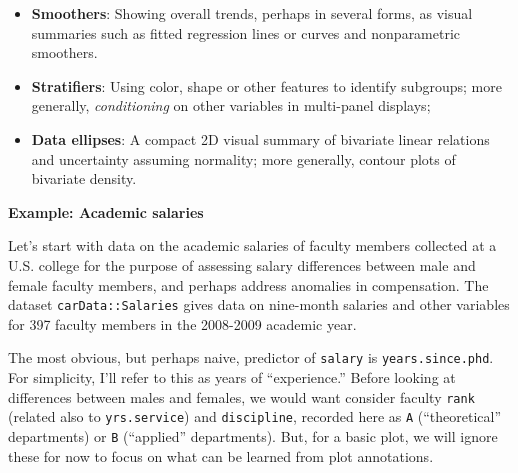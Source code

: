 \documentclass[
  letterpaper,
  10pt,
  krantz2]{krantz}
\makeatletter
\newenvironment{Shaded}{\begin{snugshade}}{\end{snugshade}}
\newcommand{\AttributeTok}[1]{\textcolor[rgb]{0.40,0.45,0.13}{#1}}
\newcommand{\CommentTok}[1]{\textcolor[rgb]{0.37,0.37,0.37}{#1}}
\newcommand{\FunctionTok}[1]{\textcolor[rgb]{0.28,0.35,0.67}{#1}}
\newcommand{\NormalTok}[1]{\textcolor[rgb]{0.00,0.23,0.31}{#1}}
\newcommand{\StringTok}[1]{\textcolor[rgb]{0.13,0.47,0.30}{#1}}
\providecommand{\tightlist}{%
  \setlength{\itemsep}{0pt}\setlength{\parskip}{0pt}}\usepackage{longtable,booktabs,array}
\newenvironment{kframe}{%
  \medskip{}
  \setlength{\fboxsep}{.8em}
  \def\at@end@of@kframe{}%
  \ifinner\ifhmode%
  \def\at@end@of@kframe{\end{minipage}}%
  \begin{minipage}{\columnwidth}%
  \fi\fi%
  \def\FrameCommand##1{\hskip\@totalleftmargin \hskip-\fboxsep
  \colorbox{shadecolor}{##1}\hskip-\fboxsep
      \hskip-\linewidth \hskip-\@totalleftmargin \hskip\columnwidth}%
  \MakeFramed {\advance\hsize-\width
    \@totalleftmargin\z@ \linewidth\hsize
    \@setminipage}}%
{\par\unskip\endMakeFramed%
  \at@end@of@kframe}
\renewenvironment{Shaded}{\begin{kframe}}{\end{kframe}}
\makeatother
\begin{document}
\begin{itemize}
\tightlist
\item
  \textbf{Smoothers}: Showing overall trends, perhaps in several forms,
  as visual summaries such as fitted regression lines or curves and
  nonparametric smoothers.
\item
  \textbf{Stratifiers}: Using color, shape or other features to identify
  subgroups; more generally, \emph{conditioning} on other variables in
  multi-panel displays;
\item
  \textbf{Data ellipses}: A compact 2D visual summary of bivariate
  linear relations and uncertainty assuming normality; more generally,
  contour plots of bivariate density.
\end{itemize}

\textbf{Example: Academic salaries}

Let's start with data on the academic salaries of faculty members
collected at a U.S. college for the purpose of assessing salary
differences between male and female faculty members, and perhaps address
anomalies in compensation. The dataset \texttt{carData::Salaries} gives
data on nine-month salaries and other variables for 397 faculty members
in the 2008-2009 academic year.

\begin{Shaded}
\end{Shaded}

The most obvious, but perhaps naive, predictor of \texttt{salary} is
\texttt{years.since.phd}. For simplicity, I'll refer to this as years of
``experience.'' Before looking at differences between males and females,
we would want consider faculty \texttt{rank} (related also to
\texttt{yrs.service}) and \texttt{discipline}, recorded here as
\texttt{A} (``theoretical'' departments) or \texttt{B} (``applied''
departments). But, for a basic plot, we will ignore these for now to
focus on what can be learned from plot annotations.
\end{document}
